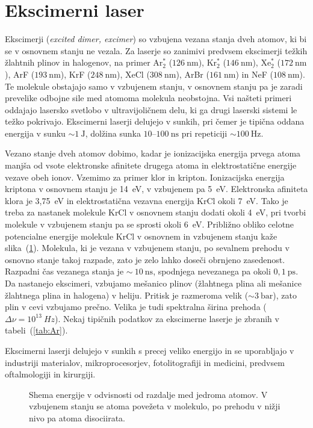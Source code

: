 \section{Ekscimerni laser}
Ekscimerji ({\it excited dimer, excimer}) so vzbujena vezana stanja dveh atomov, 
ki bi se v osnovnem stanju ne vezala. Za laserje so zanimivi predvsem ekscimerji
težkih žlahtnih plinov in halogenov, na primer Ar$_2^*$ ($126~\si{\nano\metre}$), 
Kr$_2^*$ ($146~\si{\nano\metre}$), Xe$_2^*$ ($172~\si{\nano\metre}$),
ArF ($193~\si{\nano\metre}$), KrF ($248~\si{\nano\metre}$), 
XeCl ($308~\si{\nano\metre}$), ArBr ($161~\si{\nano\metre}$) in 
NeF ($108~\si{\nano\metre}$). Te molekule obstajajo samo v vzbujenem stanju,
v osnovnem stanju pa je zaradi prevelike odbojne sile med atomoma molekula neobstojna.
Vsi našteti primeri oddajajo lasersko svetlobo v
ultravijoličnem delu, ki ga drugi laserski sistemi le težko pokrivajo. 
Ekscimerni laserji delujejo v sunkih, pri čemer je tipična oddana energija v sunku 
$\sim 1~\si{\joule}$, dolžina sunka $10$--$100~\si{\nano\second}$ pri repeticiji
$\sim 100~\si{\hertz}$.

Vezano stanje dveh atomov dobimo, kadar je ionizacijska energija prvega
atoma manjša od vsote elektronske afinitete drugega atoma in
elektrostatične energije vezave obeh ionov. Vzemimo za primer klor in
kripton. Ionizacijska energija kriptona v osnovnem stanju je 14~eV, v
vzbujenem pa 5~eV. Elektronska afiniteta klora je 3,75~eV in
elektrostatična vezavna energija KrCl okoli 7~eV. Tako je treba za nastanek
molekule KrCl v osnovnem stanju dodati okoli 4~eV, pri tvorbi
molekule v vzbujenem stanju pa se sprosti okoli 6~eV. Približno obliko
celotne potencialne energije molekule KrCl v osnovnem in vzbujenem stanju
kaže slika~(\ref{fig:exE}). Molekula, ki je vezana v vzbujenem stanju, po
sevalnem prehodu v osnovno stanje takoj razpade, zato je zelo lahko doseči
obrnjeno zasedenost. Razpadni čas vezanega stanja je $\sim~10~\si{\nano\second}$,
spodnjega nevezanega pa okoli $0,1~\si{\pico\second}$.
Da nastanejo ekscimeri, vzbujamo mešanico 
plinov (žlahtnega plina ali mešanice žlahtnega plina in halogena) v heliju. Pritisk
je razmeroma velik ($\sim 3~\si{\bar}$), zato plin v cevi vzbujamo prečno.
Velika je tudi spektralna širina prehoda ($\Delta\nu = 10^{13}~\si{Hz}$). Nekaj tipičnih podatkov 
za ekscimerne laserje je zbranih v tabeli~(\ref{tab:Ar}).

Ekscimerni laserji delujejo v sunkih s precej veliko energijo in se uporabljajo 
v industriji materialov, mikroprocesorjev, fotolitografiji in medicini, predvsem 
oftalmologiji in kirurgiji.
\begin{figure}[h]
\centering
\def\svgwidth{50truemm} 

\caption{Shema energije v odvisnosti od razdalje med jedroma atomov. V vzbujenem stanju
se atoma povežeta v molekulo, po prehodu v nižji nivo pa atoma disociirata.}
\label{fig:exE}
\end{figure}

